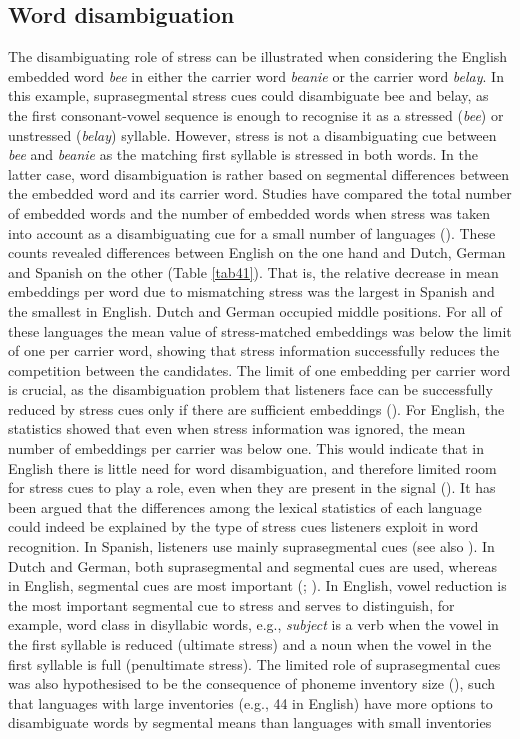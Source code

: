 \subsection{Word disambiguation}
The disambiguating role of stress can be illustrated when considering the English embedded word \textit{bee} in either the carrier word \textit{beanie} or the carrier word \textit{belay}. In this example, suprasegmental stress cues could disambiguate bee and belay, as the first consonant-vowel sequence is enough to recognise it as a stressed (\textit{bee}) or unstressed (\textit{belay}) syllable. However, stress is not a disambiguating cue between \textit{bee} and \textit{beanie} as the matching first syllable is stressed in both words. In the latter case, word disambiguation is rather based on segmental differences between the embedded word and its carrier word. Studies have compared the total number of embedded words and the number of embedded words when stress was taken into account as a disambiguating cue for a small number of languages (\citealt{cutler_phonemic_2004}). These counts revealed differences between English on the one hand and Dutch, German and Spanish on the other (Table \ref{tab41}). That is, the relative decrease in mean embeddings per word due to mismatching stress was the largest in Spanish and the smallest in English. Dutch and German occupied middle positions. For all of these languages the mean value of stress-matched embeddings was below the limit of one per carrier word, showing that stress information successfully reduces the competition between the candidates. The limit of one embedding per carrier word is crucial, as the disambiguation problem that listeners face can be successfully reduced by stress cues only if there are sufficient embeddings (\citealt{cutler_explaining_2006}). For English, the statistics showed that even when stress information was ignored, the mean number of embeddings per carrier was below one. This would indicate that in English there is little need for word disambiguation, and therefore limited room for stress cues to play a role, even when they are present in the signal (\citealt{cooper_constraints_2002}). It has been argued that the differences among the lexical statistics of each language could indeed be explained by the type of stress cues listeners exploit in word recognition. In Spanish, listeners use mainly suprasegmental cues (see also \citealt{peperkamp_perception_2010}). In Dutch and German, both suprasegmental and segmental cues are used, whereas in English, segmental cues are most important (\citealt{cooper_constraints_2002}; \citealt{yu_vocabulary_2020}). In English, vowel reduction is the most important segmental cue to stress and serves to distinguish, for example, word class in disyllabic words, e.g., \textit{subject} is a verb when the vowel in the first syllable is reduced (ultimate stress) and a noun when the vowel in the first syllable is full (penultimate stress). The limited role of suprasegmental cues was also hypothesised to be the consequence of phoneme inventory size (\citealt{cutler_phonemic_2004}), such that languages with large inventories (e.g., 44 in English) have more options to disambiguate words by segmental means than languages with small inventories 